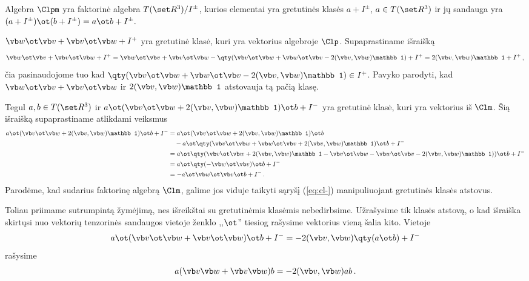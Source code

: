 \begin{definition}
	Algebra $\Clpm$ yra faktorinė algebra $T(\set R^3)/I^\pm$,
	kurios elementai yra gretutinės klasės $a+I^\pm$, $a \in T(\set R^3)$
	ir jų sandauga yra $(a+I^\pm)\ot(b+I^\pm)=a\ot b + I^\pm.$
\end{definition}

\begin{example}
	$\vb w \ot \vb v +\vb v \ot \vb w + I^+$ yra gretutinė klasė,
	kuri yra vektorius algebroje $\Clp$. 
	Supaprastiname išraišką
	\begin{equation}
		\vb w \ot \vb v +\vb v \ot \vb w + I^+
		= 
		\vb w \ot \vb v +\vb v \ot \vb w 
		- \qty(
			\vb v \ot \vb w + \vb w \ot \vb v 
			- 2(\vb v,\vb w)\mathbb 1
		) 
		+ I^+
		=
		2(\vb v,\vb w)\mathbb 1 + I^+
		\,,
	\end{equation}
	čia pasinaudojome tuo kad 
	$\qty( \vb v \ot \vb w + \vb w \ot \vb v - 2(\vb v,\vb w)\mathbb 1) \in I^+$.
	Pavyko parodyti, kad $\vb w \ot \vb v + \vb v \ot \vb w$ 
	ir $2(\vb v,\vb w) \mathbb 1$ atstovauja tą pačią klasę.
\end{example}

\begin{example}
	Tegul $a,b \in T(\set R^3)$ ir
	$ a \ot (\vb v \ot \vb w + 2(\vb v,\vb w)\mathbb 1) \ot b + I^- $
	yra gretutinė klasė, kuri yra vektorius iš $\Clm$. Šią išraišką supaprastiname atlikdami veiksmus
	\begin{equation}
		\begin{aligned}
			a \ot (\vb v \ot \vb w + 2(\vb v,\vb w)\mathbb 1) \ot b + I^- 
			& = a \ot (\vb v \ot \vb w + 2(\vb v,\vb w)\mathbb 1) \ot b
			\\& \quad - a \ot \qty(\vb v \ot \vb w + \vb w \ot \vb v +2(\vb v,\vb w) \mathbb 1)  \ot b + I^-
			\\& = a \ot \qty( \vb v \ot \vb w + 2(\vb v,\vb w)\mathbb 1 - \vb v \ot \vb w - \vb w \ot \vb v -2(\vb v,\vb w) \mathbb 1))\ot b + I^-
			\\& = a \ot \qty( - \vb w \ot \vb v )\ot b + I^-
			\\& = - a \ot	\vb w \ot \vb v	\ot b + I^- 
			\,.
		\end{aligned}
	\end{equation}
	Parodėme, kad sudarius faktorinę algebrą $\Clm$,
	galime jos viduje taikyti sąryšį (\ref{eq:cl-})
	manipuliuojant gretutinės klasės atstovus.
\end{example}
Toliau priimame sutrumpintą žymėjimą, nes išreikštai
su gretutinėmis klasėmis nebedirbsime. Užrašysime tik
klasės atstovą, o kad išraiška skirtųsi nuo 
vektorių tenzorinės sandaugos vietoje ženklo ,,$\ot$''
tiesiog rašysime vektorius vieną šalia kito.
Vietoje
\begin{equation}
	a \ot (\vb v \ot \vb w + \vb v \ot \vb w) \ot b + I^-
	=
	-2(\vb v,\vb w) \qty(a \ot b) + I^-
\end{equation}
rašysime
\begin{equation}
	a (\vb v \vb w + \vb v \vb w) b
	=
	-2(\vb v,\vb w) a b
	\,.
\end{equation}

